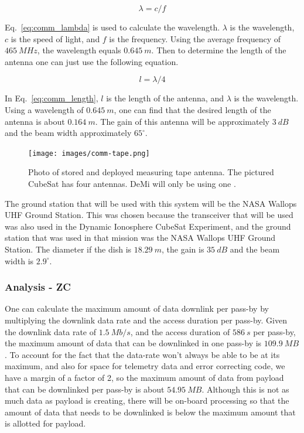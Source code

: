 \documentclass[12pt]{article}
\begin{document}
\begin{equation}\label{eq:comm_lambda}
\lambda = c/f
\end{equation}

Eq.~\ref{eq:comm_lambda} is used to calculate the wavelength. $\lambda$ is the wavelength, $c$ is the speed of light, and $f$ is the frequency. Using the average frequency of $465\ MHz$, the wavelength equals $0.645\ m$. Then to determine the length of the antenna one can just use the following equation.

\begin{equation}\label{eq:comm_length}
l = \lambda/4
\end{equation}

In Eq.~\ref{eq:comm_length}, $l$ is the length of the antenna, and $\lambda$ is the wavelength. Using a wavelength of $0.645\ m$, one can find that the desired length of the antenna is about $0.164\ m$. The gain of this antenna will be approximately $3\ dB$ and the beam width approximately $65^\circ$.

\begin{figure}[ht]\label{fig:comm_tape}
\centering
  \texttt{[image: images/comm-tape.png]}
\caption{Photo of stored and deployed measuring tape antenna. The pictured CubeSat has four antennas. DeMi will only be using one \cite{antenna}.}
\end{figure}

The ground station that will be used with this system will be the NASA Wallops UHF Ground Station. This was chosen because the transceiver that will be used was also used in the Dynamic Ionosphere CubeSat Experiment, and the ground station that was used in that mission was the NASA Wallops UHF Ground Station. The diameter if the dish is $18.29\ m$, the gain is $35\ dB$ and the beam width is $2.9^\circ$.

			\subsubsection{Analysis - ZC}

One can calculate the maximum amount of data downlink per pass-by by multiplying the downlink data rate and the access duration per pass-by. Given the downlink data rate of $1.5\ Mb/s$, and the access duration of $586\ s$ per pass-by, the maximum amount of data that can be downlinked in one pass-by is $109.9\ MB$. To account for the fact that the data-rate won’t always be able to be at its maximum, and also for space for telemetry data and error correcting code, we have a margin of a factor of 2, so the maximum amount of data from payload that can be downlinked per pass-by is about $54.95\ MB$. Although this is not as much data as payload is creating, there will be on-board processing so that the amount of data that needs to be downlinked is below the maximum amount that is allotted for payload.
\end{document}

